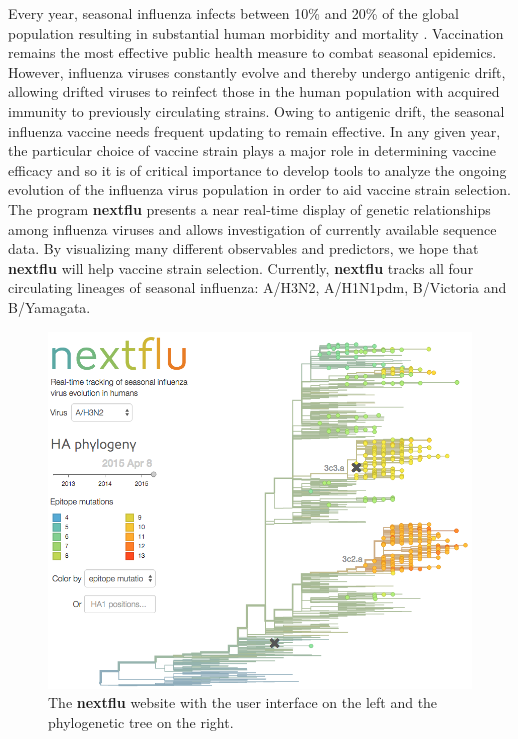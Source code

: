 \documentclass{bioinfo}
\newcommand{\nextflu}{\textbf{nextflu}}
\begin{document}

Every year, seasonal influenza infects between 10\% and 20\% of the global population resulting in substantial human morbidity and mortality \citep{flufactsheet}.
Vaccination remains the most effective public health measure to combat seasonal epidemics.
However, influenza viruses constantly evolve and thereby undergo antigenic drift, allowing drifted viruses to reinfect those in the human population with acquired immunity to previously circulating strains.
Owing to antigenic drift, the seasonal influenza vaccine needs frequent updating to remain effective.
In any given year, the particular choice of vaccine strain plays a major role in determining vaccine efficacy and so it is of critical importance to develop tools to analyze the ongoing evolution of the influenza virus population in order to aid vaccine strain selection.
The program \nextflu{} presents a near real-time display of genetic relationships among influenza viruses and allows investigation of currently available sequence data. By visualizing many different observables and predictors, we hope that \nextflu{} will help vaccine strain selection.
Currently, \nextflu{} tracks all four circulating lineages of seasonal influenza: A/H3N2, A/H1N1pdm, B/Victoria and B/Yamagata.

\begin{figure}[t!]
	\centering
	\includegraphics[width=0.99\columnwidth]{tree}
	\caption[]{The \nextflu{} website with the user interface on the left and the phylogenetic tree on the right.}
	\label{fig:tree}
\end{figure}
\end{document}
